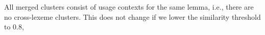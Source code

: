 \documentclass[oneside]{book}
\begin{document}
All merged clusters consist of usage contexts for the same lemma, i.e., there are no cross-lexeme clusters. This does not change if we lower the similarity threshold to 0.8, 



\end{document}
